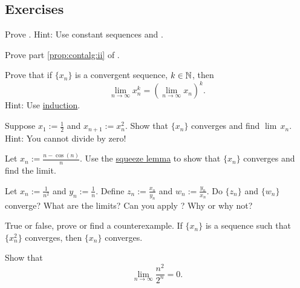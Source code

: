 \subsection{Exercises}

\begin{exercise}
Prove .  Hint: Use constant sequences
and .
\end{exercise}

\begin{exercise}
Prove part \ref{prop:contalg:ii} of .
\end{exercise}

\begin{exercise}
Prove that if $\{ x_n \}$ is a convergent sequence, $k \in {\mathbb{N}}$, then
\begin{equation*}
\lim_{n\to\infty} x_n^k = 
{\left( \lim_{n\to\infty} x_n \right)}^k .
\end{equation*}
Hint: Use \hyperref[induction:thm]{induction}.
\end{exercise}

\begin{exercise}
Suppose $x_1 := \frac{1}{2}$ and $x_{n+1} := x_n^2$.  Show that
$\{ x_n \}$ converges and find
$\lim\, x_n$.  Hint: You cannot divide by zero!
\end{exercise}

\begin{exercise}
Let $x_n := \frac{n-\cos(n)}{n}$.  Use the
\hyperref[squeeze:lemma]{squeeze lemma} to show that
$\{ x_n \}$ converges and find the limit.
\end{exercise}

\begin{exercise}
Let $x_n := \frac{1}{n^2}$ and $y_n := \frac{1}{n}$.  Define
$z_n := \frac{x_n}{y_n}$ and 
$w_n := \frac{y_n}{x_n}$.  Do $\{ z_n \}$ and $\{ w_n \}$
converge?  What are the limits?  Can you apply ?
Why or why not?
\end{exercise}

\begin{exercise}
True or false, prove or find a counterexample.  If $\{ x_n \}$ is a sequence
such that $\{ x_n^2 \}$ converges, then $\{ x_n \}$ converges.
\end{exercise}

\begin{exercise}
Show that
\begin{equation*}
\lim_{n\to\infty} \frac{n^2}{2^n} = 0 .
\end{equation*}
\end{exercise}

